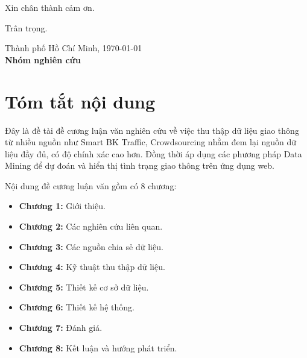 \documentclass[
11pt, %
english,%
singlespacing, %
parskip, %
headsepline, %
]{MastersDoctoralThesis} %
\begin{document}
Xin chân thành cảm ơn.

Trân trọng.\\[1cm]

\begin{minipage}[t]{0.4\textwidth}
\hspace*{1cm}
\end{minipage}
\begin{minipage}[t]{0.6\textwidth}
\begin{center}
Thành phố Hồ Chí Minh, \today\\
\textbf{Nhóm nghiên cứu}
\end{center}
\end{minipage}


\chapter{Tóm tắt nội dung}
Đây là đề tài đề cương luận văn nghiên cứu về việc thu thập dữ liệu giao thông từ nhiều nguồn như Smart BK Traffic, Crowdsourcing nhằm đem lại nguồn dữ liệu đầy đủ, có độ chính xác cao hơn. Đồng thời áp dụng các phương pháp Data Mining để dự đoán và hiển thị tình trạng giao thông trên ứng dụng web.

Nội dung đề cương luận văn gồm có 8 chương:
\begin{itemize}
\item \textbf{Chương 1:} Giới thiệu.
\item \textbf{Chương 2:} Các nghiên cứu liên quan.
\item \textbf{Chương 3:} Các nguồn chia sẻ dữ liệu.
\item \textbf{Chương 4:} Kỹ thuật thu thập dữ liệu.
\item \textbf{Chương 5:} Thiết kế cơ sở dữ liệu.
\item \textbf{Chương 6:} Thiết kế hệ thống.
\item \textbf{Chương 7:} Đánh giá.
\item \textbf{Chương 8:} Kết luận và hướng phát triển.
\end{itemize}




\tableofcontents %

\listoffigures %

\listoftables %
\end{document}

